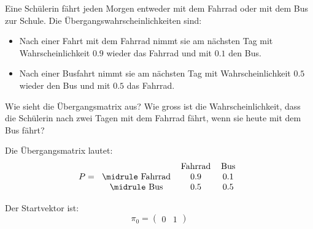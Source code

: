 \begin{myexercise}[Verkehrsmittel]
    Eine Schülerin fährt jeden Morgen entweder mit dem Fahrrad oder mit dem Bus zur Schule. Die Übergangswahrscheinlichkeiten sind:
    \begin{itemize}
        \item Nach einer Fahrt mit dem Fahrrad nimmt sie am nächsten Tag mit Wahrscheinlichkeit $0.9$ wieder das Fahrrad und mit $0.1$ den Bus.
        \item Nach einer Busfahrt nimmt sie am nächsten Tag mit Wahrscheinlichkeit $0.5$ wieder den Bus und mit $0.5$ das Fahrrad.
    \end{itemize}
    Wie sieht die Übergangsmatrix aus? Wie gross ist die Wahrscheinlichkeit, dass die Schülerin nach zwei Tagen mit dem Fahrrad fährt, wenn sie heute mit dem Bus fährt?
    \begin{myanswer}
        Die Übergangsmatrix lautet:
        \[
            P =
            \begin{tabular}{ccc}
                        & Fahrrad & Bus \\
                \midrule
                Fahrrad & 0.9     & 0.1 \\
                \midrule
                Bus     & 0.5     & 0.5 \\
            \end{tabular}
        \]

        Der Startvektor ist:
        \[
            \pi_0 =
            \begin{pmatrix}
                0 & 1
            \end{pmatrix}
        \]


\end{myanswer}
\end{myexercise}
